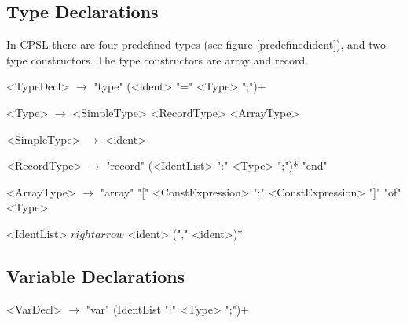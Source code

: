 \documentclass{book}
\begin{document}
\subsection{Type Declarations}

In CPSL there are four predefined types (see figure \ref{predefinedident}), and two type constructors.
The type constructors are array and record.

\begin{grammar}
<TypeDecl> $\rightarrow$ "type" (<ident> "=" <Type> ";")+

<Type> $\rightarrow$ <SimpleType> \alt <RecordType> \alt <ArrayType>

<SimpleType> $\rightarrow$ <ident>

<RecordType> $\rightarrow$ "record" (<IdentList> ":" <Type> ";")* "end"

<ArrayType> $\rightarrow$ "array" "[" <ConstExpression> ":" <ConstExpression> "]" "of" <Type>

<IdentList> $rightarrow$ <ident> ("," <ident>)*
\end{grammar}

\subsection{Variable Declarations}
\begin{grammar}
<VarDecl> $\rightarrow$ "var" (IdentList ":" <Type> ";")+
\end{grammar}
\end{document}

